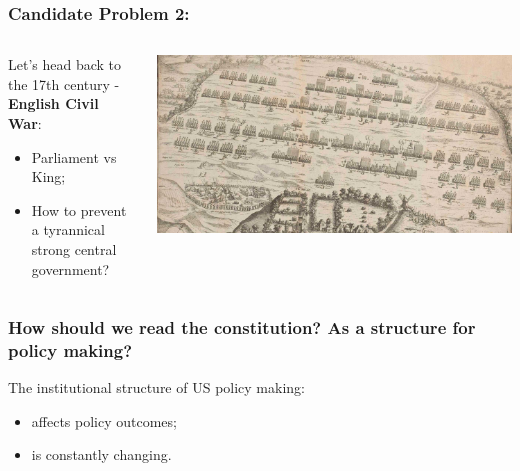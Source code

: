 \documentclass[aspectratio=169]{beamer}
\theoremstyle{principle}
\begin{document}
\begin{frame}
\frametitle{Candidate Problem 2:}

\begin{columns}

\begin{column}{0.5\textwidth}
Let's head back to the 17th century - \textbf{English Civil War}: 
\bigskip
\begin{itemize}
\item Parliament vs King;
\bigskip
\item How to prevent a tyrannical strong central government?
\end{itemize}
\end{column}

\begin{column}{0.5\textwidth}  %
    \begin{center}
     \includegraphics[scale=0.1]{naseby.jpg}
     \end{center}
\end{column}

\end{columns}

\end{frame}

\begin{frame}
\frametitle{How should we read the constitution?  As a structure for policy making?}

The institutional structure of US policy making:
\bigskip
\begin{itemize}
\item affects policy outcomes;
\bigskip
\bigskip
\item is constantly changing.
\end{itemize}

\end{frame}
\end{document}
